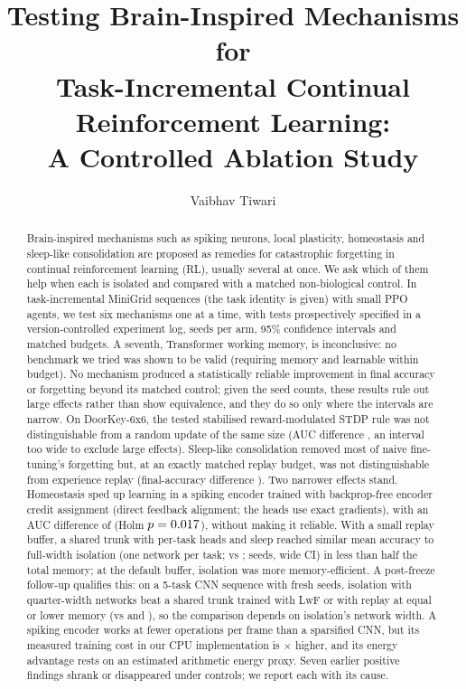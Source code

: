 \documentclass[10pt]{article}
\title{Testing Brain-Inspired Mechanisms for\\ Task-Incremental Continual Reinforcement Learning:\\
A Controlled Ablation Study}
\author{\name Vaibhav Tiwari \\
      \addr \todo{affiliation and contact email}}
\begin{document}
\maketitle

\begin{abstract}
Brain-inspired mechanisms such as spiking neurons, local plasticity, homeostasis and sleep-like consolidation are
proposed as remedies for catastrophic forgetting in continual reinforcement learning (RL), usually several at
once. We ask which of them help when each is isolated and compared with a matched non-biological control. In
task-incremental MiniGrid sequences (the task identity is given) with small PPO agents, we test six mechanisms one at
a time, with tests prospectively specified in a version-controlled experiment log, \seedRange seeds per arm, 95\%
confidence intervals and matched budgets. A seventh, Transformer working memory, is inconclusive: no benchmark we
tried was shown to be valid (requiring memory and learnable within budget). No mechanism produced a statistically
reliable improvement in final accuracy or forgetting beyond its matched control; given the seed counts, these results
rule out large effects rather than show equivalence, and they do so only where the intervals are narrow. On
DoorKey-6x6, the tested stabilised reward-modulated STDP rule was not distinguishable from a random update of the same
size (AUC difference \rqOneContrBAucCi, an interval too wide to exclude large effects). Sleep-like consolidation
removed most of naive fine-tuning's forgetting but, at an exactly matched replay budget, was not distinguishable from
experience replay (final-accuracy difference \matchAccCi). Two narrower effects stand. Homeostasis sped up learning in
a spiking encoder trained with backprop-free encoder credit assignment (direct feedback alignment; the heads use exact
gradients), with an AUC difference of \dfaAucCi (Holm $p=0.017$), without making it reliable. With a small replay buffer, a
shared trunk with per-task heads and sleep reached similar mean accuracy to full-width isolation (one network per task;
\smallSnnTwoHundredMean vs \snnIsoMean; \smallSnnTwoHundredN seeds, wide CI) in less than half the total memory; at
the default buffer, isolation was more memory-efficient. A post-freeze follow-up qualifies this: on a 5-task CNN
sequence with \postN fresh seeds, isolation with quarter-width networks beat a shared trunk trained with LwF or with
replay at equal or lower memory (\postNarrowMean vs \postLwfMean and \postReplayMean), so the comparison depends on
isolation's network width. A spiking encoder works at fewer operations per frame than a sparsified CNN, but its
measured training cost in our CPU implementation is \snnCpuSlowdown{}$\times$ higher, and its energy advantage rests
on an estimated arithmetic energy proxy. Seven earlier positive findings shrank or disappeared under controls; we
report each with its cause.
\end{abstract}
\end{document}

